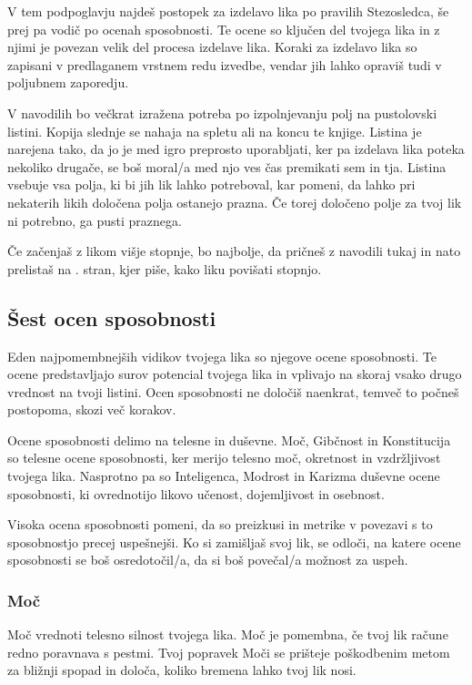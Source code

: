 V tem podpoglavju najdeš postopek za izdelavo lika po pravilih Stezosledca, še prej pa vodič po ocenah sposobnosti. Te ocene so ključen del tvojega lika in z njimi je povezan velik del procesa izdelave lika. Koraki za izdelavo lika so zapisani v predlaganem vrstnem redu izvedbe, vendar jih lahko opraviš tudi v poljubnem zaporedju.

V navodilih bo večkrat izražena potreba po izpolnjevanju polj na pustolovski listini. Kopija slednje se nahaja na spletu ali na koncu te knjige. Listina je narejena tako, da jo je med igro preprosto uporabljati, ker pa izdelava lika poteka nekoliko drugače, se boš moral/a med njo ves čas premikati sem in tja. Listina vsebuje vsa polja, ki bi jih lik lahko potreboval, kar pomeni, da lahko pri nekaterih likih določena polja ostanejo prazna. Če torej določeno polje za tvoj lik ni potrebno, ga pusti praznega.

Če začenjaš z likom višje stopnje, bo najbolje, da pričneš z navodili tukaj in nato prelistaš na \pageref{sub:levelup}. stran, kjer piše, kako liku povišati stopnjo.

\subsection{Šest ocen sposobnosti}
Eden najpomembnejših vidikov tvojega lika so njegove ocene sposobnosti. Te ocene predstavljajo surov potencial tvojega lika in vplivajo na skoraj vsako drugo vrednost na tvoji listini. Ocen sposobnosti ne določiš naenkrat, temveč to počneš postopoma, skozi več korakov.

Ocene sposobnosti delimo na telesne in duševne. Moč, Gibčnost in Konstitucija so telesne ocene sposobnosti, ker merijo telesno moč, okretnost in vzdržljivost tvojega lika. Nasprotno pa so Inteligenca, Modrost in Karizma duševne ocene sposobnosti, ki ovrednotijo likovo učenost, dojemljivost in osebnost.

Visoka ocena sposobnosti pomeni, da so preizkusi in metrike v povezavi s to sposobnostjo precej uspešnejši. Ko si zamišljaš svoj lik, se odloči, na katere ocene sposobnosti se boš osredotočil/a, da si boš povečal/a možnost za uspeh.

\subsubsection{Moč}
Moč vrednoti telesno silnost tvojega lika. Moč je pomembna, če tvoj lik račune redno poravnava s pestmi. Tvoj popravek Moči se prišteje poškodbenim metom za bližnji spopad in določa, koliko bremena lahko tvoj lik nosi.

